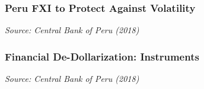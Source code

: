 \documentclass{beamer}
\begin{document}
\begin{frame}
\frametitle{Peru FXI to Protect Against Volatility}
\medskip
\emph{Source: Central Bank of Peru (2018)}
\end{frame}


\begin{frame}
\frametitle{Financial De-Dollarization: Instruments}
\medskip
\emph{Source: Central Bank of Peru (2018)}
\end{frame}
\end{document}
